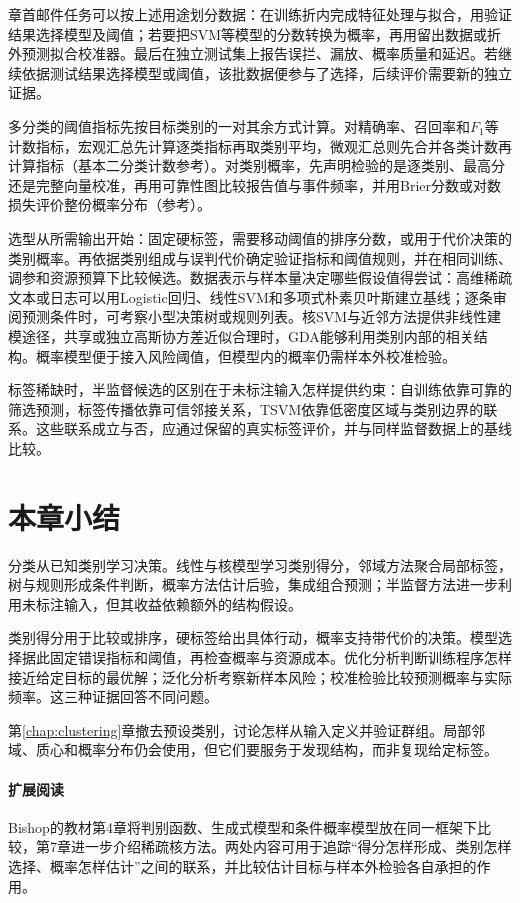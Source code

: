 章首邮件任务可以按上述用途划分数据：在训练折内完成特征处理与拟合，用验证结果选择模型及阈值；若要把SVM等模型的分数转换为概率，再用留出数据或折外预测拟合校准器。最后在独立测试集上报告误拦、漏放、概率质量和延迟。若继续依据测试结果选择模型或阈值，该批数据便参与了选择，后续评价需要新的独立证据。

多分类的阈值指标先按目标类别的一对其余方式计算。对精确率、召回率和$F_1$等计数指标，宏观汇总先计算逐类指标再取类别平均，微观汇总则先合并各类计数再计算指标（基本二分类计数参考）。对类别概率，先声明检验的是逐类别、最高分还是完整向量校准，再用可靠性图比较报告值与事件频率，并用Brier分数或对数损失评价整份概率分布（参考）。

选型从所需输出开始：固定硬标签，需要移动阈值的排序分数，或用于代价决策的类别概率。再依据类别组成与误判代价确定验证指标和阈值规则，并在相同训练、调参和资源预算下比较候选。数据表示与样本量决定哪些假设值得尝试：高维稀疏文本或日志可以用Logistic回归、线性SVM和多项式朴素贝叶斯建立基线；逐条审阅预测条件时，可考察小型决策树或规则列表。核SVM与近邻方法提供非线性建模途径，共享或独立高斯协方差近似合理时，GDA能够利用类别内部的相关结构。概率模型便于接入风险阈值，但模型内的概率仍需样本外校准检验。

标签稀缺时，半监督候选的区别在于未标注输入怎样提供约束：自训练依靠可靠的筛选预测，标签传播依靠可信邻接关系，TSVM依靠低密度区域与类别边界的联系。这些联系成立与否，应通过保留的真实标签评价，并与同样监督数据上的基线比较。

\section{本章小结}
\label{sec:classification-summary}

分类从已知类别学习决策。线性与核模型学习类别得分，邻域方法聚合局部标签，树与规则形成条件判断，概率方法估计后验，集成组合预测；半监督方法进一步利用未标注输入，但其收益依赖额外的结构假设。

类别得分用于比较或排序，硬标签给出具体行动，概率支持带代价的决策。模型选择据此固定错误指标和阈值，再检查概率与资源成本。优化分析判断训练程序怎样接近给定目标的最优解；泛化分析考察新样本风险；校准检验比较预测概率与实际频率。这三种证据回答不同问题。

第\ref{chap:clustering}章撤去预设类别，讨论怎样从输入定义并验证群组。局部邻域、质心和概率分布仍会使用，但它们要服务于发现结构，而非复现给定标签。

\paragraph{扩展阅读}
Bishop的教材第4章将判别函数、生成式模型和条件概率模型放在同一框架下比较，第7章进一步介绍稀疏核方法。两处内容可用于追踪“得分怎样形成、类别怎样选择、概率怎样估计”之间的联系，并比较估计目标与样本外检验各自承担的作用。